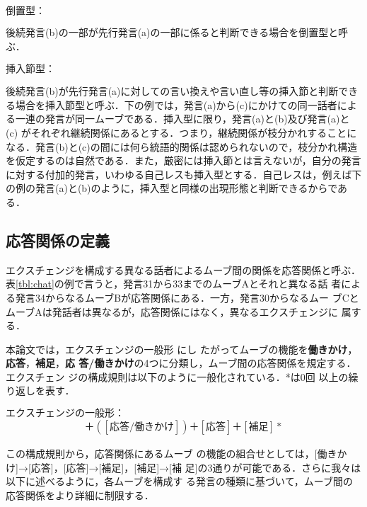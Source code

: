 \begin{description}
\item{\boldmath $倒置型：$}

後続発言(b)の一部が先行発言(a)の一部に係ると判断できる場合を倒置型と呼ぶ．

  

\item{\boldmath $挿入節型：$}

後続発言(b)が先行発言(a)に対しての言い換えや言い直し等の挿入節と判断でき
る場合を挿入節型と呼ぶ．下の例では，発言(a)から(c)にかけての同一話者によ
る一連の発言が同一ムーブである．挿入型に限り，発言(a)と(b)及び発言(a)と
(c) がそれぞれ継続関係にあるとする．つまり，継続関係が枝分かれすることに
なる．発言(b)と(c)の間には何ら統語的関係は認められないので，枝分かれ構造
を仮定するのは自然である．また，厳密には挿入節とは言えないが，自分の発言
に対する付加的発言，いわゆる自己レスも挿入型とする．自己レスは，例えば下
の例の発言(a)と(b)のように，挿入型と同様の出現形態と判断できるからである．

  

\end{description}

\subsection{応答関係の定義}

エクスチェンジを構成する異なる話者によるムーブ間の関係を応答関係と呼ぶ．
表\ref{tbl:chat}の例で言うと，発言31から33までのムーブAとそれと異なる話
者による発言34からなるムーブBが応答関係にある．一方，発言30からなるムー
ブCとムーブAは発話者は異なるが，応答関係にはなく，異なるエクスチェンジに
属する．

本論文では，エクスチェンジの一般形\cite{Sinclair:92,Ishizaki:01} にし
たがってムーブの機能を{\bf 働きかけ}，{\bf 応答}，{\bf 補足}，{\bf 応
答/働きかけ}の4つに分類し，ムーブ間の応答関係を規定する．エクスチェン
ジの構成規則は以下のように一般化されている\cite{Ishizaki:01}．*は0回
以上の繰り返しを表す．

\begin{description}\item{\boldmath $エクスチェンジの一般形：
$}\begin{eqnarray*} [働きかけ]＋([応答/働きかけ])＋[応答]＋[補足
]*\end{eqnarray*}\end{description}この構成規則から，応答関係にあるムーブ
の機能の組合せとしては，[働きかけ]→[応答]，[応答]→[補足]，[補足]→[補
足]の3通りが可能である．さらに我々は以下に述べるように，各ムーブを構成す
る発言の種類に基づいて，ムーブ間の応答関係をより詳細に制限する．

